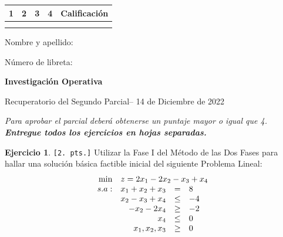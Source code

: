\documentclass[a4paper,oneside,11pt]{amsart}
\newcommand{\nombremateria}
{Investigaci\'on Operativa}
\newcommand{\numeroparcial}
    {Recuperatorio del Segundo Parcial}
\newcommand{\fecha}
    {14 de Diciembre de 2022}
\theoremstyle{definition}
\newtheorem{quest}{Ejercicio}
\begin{document}
\hfill \hfill
\begin{tabular}[c]{|c|c|c|c|c|}
\hline 
1 & 2 & 3 & 4 & Calificaci\'on \\ \hline \hline
\hspace{1 cm} & \hspace{1 cm} & \hspace{1 cm} & \hspace{1 cm} & \hspace{1.3 cm} \\
\hspace{1 cm} & \hspace{1  cm} & \hspace{1  cm} & \hspace{1  cm} & \hspace{1.3 cm} \\ \hline

\end{tabular}

\vspace{-1cm}

\noindent Nombre y apellido:

\vspace{0.2cm}

\noindent Número de libreta:

\noindent \hrulefill 

\smallskip
\renewcommand{\baselinestretch}{1.1}

\begin{center}
	\large \textbf{\nombremateria} 
	
	\numeroparcial -- \fecha
\end{center}

\noindent\textit{Para aprobar el parcial deberá obtenerse un puntaje mayor o igual que 4. \textbf{Entregue todos los ejercicios en hojas separadas.}}
\renewcommand{\theenumi}{\textbf{\arabic{enumi}}}

\fontsize{11pt}{0.4cm}\selectfont
\begin{quest} \verb|[2. pts.]| Utilizar la Fase I del Método de las Dos Fases para hallar una solución básica factible inicial del siguiente Problema Lineal:
\[
\begin{array}{rrcl}
\min & \multicolumn{3}{l}{z = 2x_1-2x_2-x_3+x_4} \\
s.a: & x_1+x_2+x_3 & = & 8 \\
 & x_2-x_3+x_4 & \leq & -4 \\
 & -x_2-2x_4 & \geq & -2 \\
 & x_4 & \leq & 0 \\
 & x_1, x_2, x_3 & \geq & 0
\end{array}
\]

\end{quest}
\end{document}
